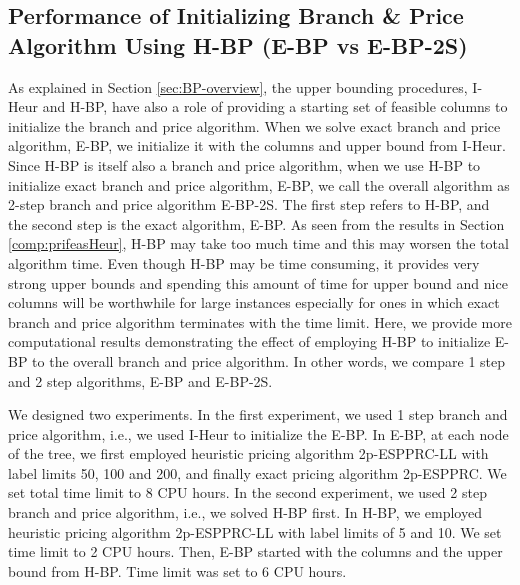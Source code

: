 \subsection{Performance of Initializing Branch \& Price Algorithm Using H-BP (E-BP vs E-BP-2S)}
As explained in  Section \ref{sec:BP-overview}, the upper bounding
procedures, I-Heur and H-BP, have also a role of providing a starting
set of feasible columns to initialize the branch and price algorithm.
When we solve exact branch and price algorithm, E-BP, we initialize it with
the columns and upper bound from I-Heur. Since H-BP is itself also a branch and
price algorithm, when we use H-BP to initialize exact branch and price algorithm,
E-BP, we call the overall algorithm as 2-step branch and price algorithm E-BP-2S.
The first step refers to H-BP, and the second step is the exact algorithm, E-BP.
As seen from the results in Section \ref{comp:prifeasHeur}, H-BP may take
too much time and this may worsen the total algorithm time. Even though H-BP may be
time consuming, it provides very strong upper bounds and spending this amount of time
for upper bound and nice columns will be worthwhile for large instances especially for
ones in which exact branch and price algorithm terminates with the time limit.
Here, we provide more computational results demonstrating the effect of
employing H-BP to initialize E-BP  to the overall branch and price algorithm.
In other words, we compare 1 step and 2 step algorithms, E-BP and E-BP-2S.

We designed two experiments. In the first experiment, we used 1 step branch and price
algorithm, i.e., we used I-Heur to initialize the E-BP. In E-BP, at each node
of the tree, we first employed heuristic pricing algorithm 2p-ESPPRC-LL with label limits
50, 100 and 200, and finally exact pricing algorithm 2p-ESPPRC.
We set total time limit to 8 CPU hours. In the second experiment, we used
2 step branch and price algorithm, i.e., we solved H-BP first. In H-BP, we
employed heuristic pricing algorithm 2p-ESPPRC-LL with label limits
of 5 and 10. We set time limit to 2 CPU hours. Then, E-BP started with the
columns and the upper bound from H-BP. Time limit was set to 6 CPU hours.

